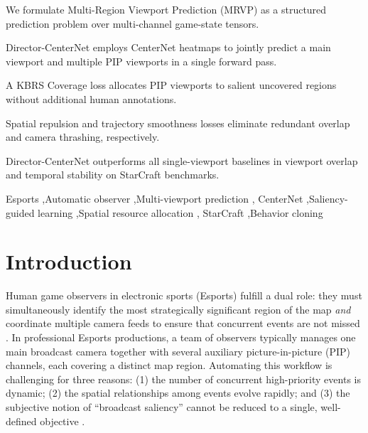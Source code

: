 \documentclass[preprint,12pt]{elsarticle}
\begin{document}
\begin{frontmatter}
\begin{highlights}
\item We formulate Multi-Region Viewport Prediction (MRVP) as a structured
      prediction problem over multi-channel game-state tensors.
\item Director-CenterNet employs CenterNet heatmaps to jointly predict a main
      viewport and multiple PIP viewports in a single forward pass.
\item A KBRS Coverage loss allocates PIP viewports to salient uncovered regions
      without additional human annotations.
\item Spatial repulsion and trajectory smoothness losses eliminate redundant
      overlap and camera thrashing, respectively.
\item Director-CenterNet outperforms all single-viewport baselines in viewport
      overlap and temporal stability on StarCraft benchmarks.
\end{highlights}

\begin{keyword}
Esports \sep Automatic observer \sep Multi-viewport prediction \sep
CenterNet \sep Saliency-guided learning \sep Spatial resource allocation \sep
StarCraft \sep Behavior cloning
\end{keyword}

\end{frontmatter}


\section{Introduction}
\label{sec:intro}

Human game observers in electronic sports (Esports) fulfill a dual role: 
they must simultaneously identify the most strategically significant region 
of the map \emph{and} coordinate multiple camera feeds to ensure that 
concurrent events are not missed \cite{joo2023learning}. In professional 
Esports productions, a team of observers typically manages one main broadcast 
camera together with several auxiliary picture-in-picture (PIP) channels, each 
covering a distinct map region. Automating this workflow is challenging for 
three reasons: (1) the number of concurrent high-priority events is dynamic; 
(2) the spatial relationships among events evolve rapidly; and (3) the 
subjective notion of ``broadcast saliency'' cannot be reduced to a single, 
well-defined objective \cite{bae2025observer}.
\end{document}
